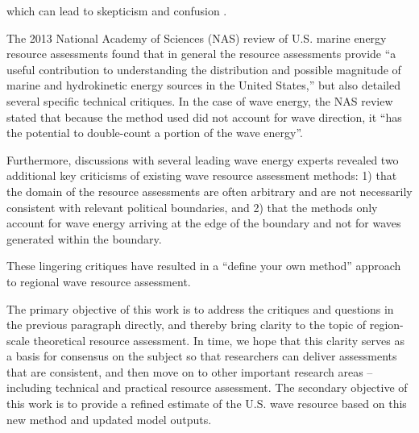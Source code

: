 which can lead to skepticism and confusion \citep[]{internationalelectrotechnicalcommissionPart101Wave2015, robertsonCharacterizingShoreWave2014, gunnQuantifyingGlobalWave2012, hughesNationalscaleWaveEnergy2010, hemerRevisedAssessmentAustralia2017, nationalresearchcouncilEvaluationDepartmentEnergy2013}.

The 2013 National Academy of Sciences (NAS) review of U.S. marine energy resource assessments found that in general the resource assessments provide “a useful contribution to understanding the distribution and possible magnitude of marine and hydrokinetic energy sources in the United States,” but also detailed several specific technical critiques. In the case of wave energy, the NAS review stated that because the method used did not account for wave direction, it “has the potential to double-count a portion of the wave energy”. 

Furthermore, discussions with several leading wave energy experts revealed two additional key criticisms of existing wave resource assessment methods: 1) that the domain of the resource assessments are often arbitrary and are not necessarily consistent with relevant political boundaries, and 2) that the methods only account for wave energy arriving at the edge of the boundary and not for waves generated within the boundary.

These lingering critiques have resulted in a “define your own method” approach to regional wave resource assessment. 

The primary objective of this work is to address the critiques and questions in the previous paragraph directly, and thereby bring clarity to the topic of region-scale theoretical resource assessment. In time, we hope that this clarity serves as a basis for consensus on the subject so that researchers can deliver assessments that are consistent, and then move on to other important research areas – including technical and practical resource assessment. The secondary objective of this work is to provide a refined estimate of the U.S. wave resource based on this new method and updated model outputs.


